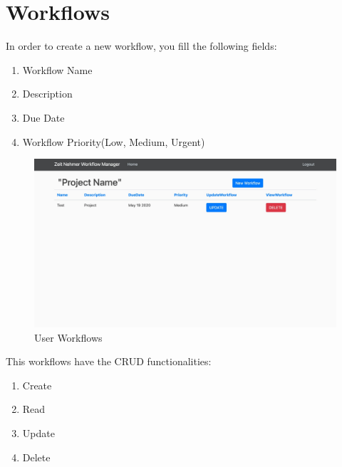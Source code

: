 \documentclass{article}[draft]
\begin{document}
\section{Workflows}
In order to create a new workflow, you fill the following fields:
\begin{enumerate}
    \item Workflow Name
    \item Description
    \item Due Date
    \item Workflow Priority(Low, Medium, Urgent)
\end{enumerate}
\begin{figure}[h!]
            \centering
            \includegraphics[width=1.2\columnwidth]{Images/Workflows.jpg}
            \caption{User Workflows}
            \label{fig:figure 9}
        \end{figure}
This workflows have the CRUD functionalities:
\begin{enumerate}
    \item Create
    \item Read
    \item Update
    \item Delete
\end{enumerate}
\end{document}
